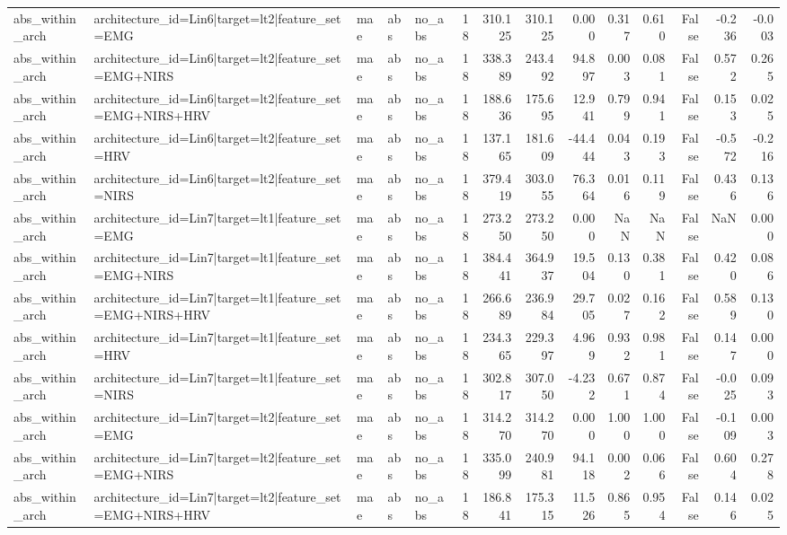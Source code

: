 \begin{table}
\begin{tabular}{lllllrrrrrrrrr}
abs_within_arch & architecture_id=Lin6|target=lt2|feature_set=EMG & mae & abs & no_abs & 18 & 310.125 & 310.125 & 0.000 & 0.317 & 0.610 & False & -0.236 & -0.003 \\
abs_within_arch & architecture_id=Lin6|target=lt2|feature_set=EMG+NIRS & mae & abs & no_abs & 18 & 338.389 & 243.492 & 94.897 & 0.003 & 0.081 & False & 0.572 & 0.265 \\
abs_within_arch & architecture_id=Lin6|target=lt2|feature_set=EMG+NIRS+HRV & mae & abs & no_abs & 18 & 188.636 & 175.695 & 12.941 & 0.799 & 0.941 & False & 0.153 & 0.025 \\
abs_within_arch & architecture_id=Lin6|target=lt2|feature_set=HRV & mae & abs & no_abs & 18 & 137.165 & 181.609 & -44.444 & 0.043 & 0.193 & False & -0.572 & -0.216 \\
abs_within_arch & architecture_id=Lin6|target=lt2|feature_set=NIRS & mae & abs & no_abs & 18 & 379.419 & 303.055 & 76.364 & 0.016 & 0.119 & False & 0.436 & 0.136 \\
abs_within_arch & architecture_id=Lin7|target=lt1|feature_set=EMG & mae & abs & no_abs & 18 & 273.250 & 273.250 & 0.000 & NaN & NaN & False & NaN & 0.000 \\
abs_within_arch & architecture_id=Lin7|target=lt1|feature_set=EMG+NIRS & mae & abs & no_abs & 18 & 384.441 & 364.937 & 19.504 & 0.130 & 0.381 & False & 0.420 & 0.086 \\
abs_within_arch & architecture_id=Lin7|target=lt1|feature_set=EMG+NIRS+HRV & mae & abs & no_abs & 18 & 266.689 & 236.984 & 29.705 & 0.027 & 0.162 & False & 0.589 & 0.130 \\
abs_within_arch & architecture_id=Lin7|target=lt1|feature_set=HRV & mae & abs & no_abs & 18 & 234.365 & 229.397 & 4.969 & 0.932 & 0.981 & False & 0.147 & 0.000 \\
abs_within_arch & architecture_id=Lin7|target=lt1|feature_set=NIRS & mae & abs & no_abs & 18 & 302.817 & 307.050 & -4.232 & 0.671 & 0.874 & False & -0.025 & 0.093 \\
abs_within_arch & architecture_id=Lin7|target=lt2|feature_set=EMG & mae & abs & no_abs & 18 & 314.270 & 314.270 & 0.000 & 1.000 & 1.000 & False & -0.109 & 0.003 \\
abs_within_arch & architecture_id=Lin7|target=lt2|feature_set=EMG+NIRS & mae & abs & no_abs & 18 & 335.099 & 240.981 & 94.118 & 0.002 & 0.066 & False & 0.604 & 0.278 \\
abs_within_arch & architecture_id=Lin7|target=lt2|feature_set=EMG+NIRS+HRV & mae & abs & no_abs & 18 & 186.841 & 175.315 & 11.526 & 0.865 & 0.954 & False & 0.146 & 0.025 \\

\end{tabular}
\end{table}
